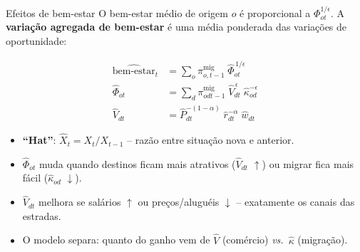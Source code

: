 \begin{frame}{Efeitos de bem-estar}
    O bem-estar médio de origem $o$ é proporcional a $\Phi_{ot}^{1/\epsilon}$.
    A \textbf{variação agregada de bem-estar} é uma média ponderada das variações de oportunidade:

    \begin{align}
        \widehat{\text{bem-estar}}_t &= \sum_o \pi_{o,t-1}^{\text{mig}}\;\widehat{\Phi}_{ot}^{\,1/\epsilon} \label{eq:welfare} \\[3pt]
        \widehat{\Phi}_{ot} &= \sum_d \pi_{odt-1}^{\text{mig}}\;\widehat{V}_{dt}^{\,\epsilon}\;\widehat{\kappa}_{od}^{-\epsilon} \label{eq:phi} \\[3pt]
        \widehat{V}_{dt}   &= \widehat{P}_{dt}^{-(1-\alpha)}\;\widehat{r}_{dt}^{-\alpha}\;\widehat{w}_{dt} \label{eq:vhat}
    \end{align}

    \begin{itemize}\small
        \item \textbf{``Hat''}: $\widehat{X}_t = X_t / X_{t-1}$ -- razão entre situação nova e anterior.
        \item $\widehat{\Phi}_{ot}$ muda quando destinos ficam mais atrativos ($\widehat{V}_{dt}$ $\uparrow$) ou migrar fica mais fácil ($\widehat{\kappa}_{od}$ $\downarrow$).
        \item $\widehat{V}_{dt}$ melhora se salários $\uparrow$ ou preços/aluguéis $\downarrow$ -- exatamente os canais das estradas.
        \item O modelo separa: quanto do ganho vem de $\widehat{V}$ (comércio) \textit{vs.}\ $\widehat{\kappa}$ (migração).
    \end{itemize}
\end{frame}

